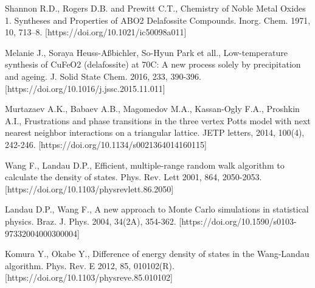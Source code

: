 \begin{thebibliography}{111}
Shannon R.D., Rogers D.B. and Prewitt C.T., Chemistry of Noble Metal Oxides 1. Syntheses and Properties of ABO2 Delafossite Compounds. Inorg. Chem. 1971, 10, 713–8. [https://doi.org/10.1021/ic50098a011]

Melanie J., Soraya Heuss-Aßbichler, So-Hyun Park et all., Low-temperature synthesis of CuFeO2 (delafossite) at 70C: A new process solely by precipitation and ageing. J. Solid State Chem. 2016, 233, 390-396. [https://doi.org/10.1016/j.jssc.2015.11.011]

Murtazaev A.K., Babaev A.B., Magomedov M.A., Kassan-Ogly F.A., Proshkin A.I., Frustrations and phase transitions in the three vertex Potts model with next nearest neighbor interactions on a triangular lattice. JETP letters, 2014, 100(4), 242-246. [https://doi.org/10.1134/s0021364014160115]

Wang F., Landau D.P., Efficient, multiple-range random walk algorithm to calculate the density of states. Phys. Rev. Lett 2001, 864, 2050-2053. [https://doi.org/10.1103/physrevlett.86.2050]

Landau D.P., Wang F., A new approach to Monte Carlo simulations in statistical physics. Braz. J. Phys. 2004, 34(2A), 354-362. [https://doi.org/10.1590/s0103-97332004000300004]

Komura Y., Okabe Y., Difference of energy density of states in the Wang-Landau algorithm. Phys. Rev. E 2012, 85, 010102(R). [https://doi.org/10.1103/physreve.85.010102]











\end{thebibliography}
